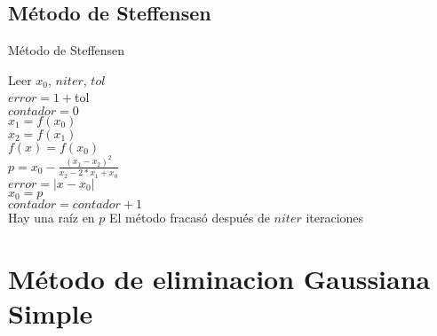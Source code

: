 \documentclass[12pt]{article}
\begin{document}
    \subsection{Método de Steffensen}
    \begin{algorithm}[H]
        \caption{Método de Steffensen}
        \SetAlgoLined
        Leer $x_0$, $niter$, $tol$\\

        $error = 1 + $tol\\
        $contador = 0$\\
        {
            $x_1 = f(x_0)$\\
            $x_2 = f(x_1)$\\
            $f(x) = f(x_0)$\\
            $p = x_0 - \frac{(x_1-x_2)^2}{x_2-2*x_1+x_0}$\\
            $error = |x - x_0|$\\
            $x_0 = p$\\
            $contador = contador + 1$\\
        }
        {Hay una raíz en $p$}
        {El método fracasó después de $niter$ iteraciones}
    \end{algorithm}

    \section{Método de eliminacion Gaussiana Simple}

    
    
    
\end{document}
